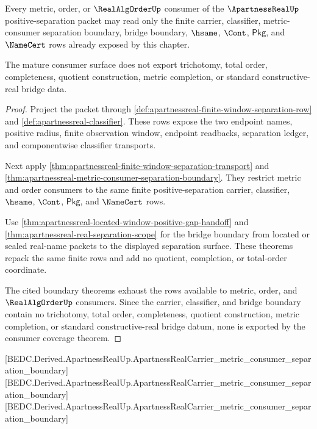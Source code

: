 \begin{theorem}
\label{thm:apartnessreal-mature-consumer-coverage}
Every metric, order, or $\RealAlgOrderUp$ consumer of the
$\ApartnessRealUp$ positive-separation packet may read only the finite carrier,
classifier, metric-consumer separation boundary, bridge boundary, $\hsame$,
$\Cont$, $\mathsf{Pkg}$, and $\NameCert$ rows already exposed by this chapter.

The mature consumer surface does not export trichotomy, total order,
completeness, quotient construction, metric completion, or standard
constructive-real bridge data.
\end{theorem}
\begin{proof}
Project the packet through
\autoref{def:apartnessreal-finite-window-separation-row} and
\autoref{def:apartnessreal-classifier}. These rows expose the two endpoint
names, positive radius, finite observation window, endpoint readbacks,
separation ledger, and componentwise classifier transports.

Next apply \autoref{thm:apartnessreal-finite-window-separation-transport} and
\autoref{thm:apartnessreal-metric-consumer-separation-boundary}. They restrict
metric and order consumers to the same finite positive-separation carrier,
classifier, $\hsame$, $\Cont$, $\mathsf{Pkg}$, and $\NameCert$ rows.

Use \autoref{thm:apartnessreal-located-window-positive-gap-handoff} and
\autoref{thm:apartnessreal-real-separation-scope} for the bridge boundary from
located or sealed real-name packets to the displayed separation surface. These
theorems repack the same finite rows and add no quotient, completion, or
total-order coordinate.

The cited boundary theorems exhaust the rows available to metric, order, and
$\RealAlgOrderUp$ consumers. Since the carrier, classifier, and bridge boundary
contain no trichotomy, total order, completeness, quotient construction, metric
completion, or standard constructive-real bridge datum, none is exported by the
consumer coverage theorem.
\end{proof}

[BEDC.Derived.ApartnessRealUp.ApartnessRealCarrier\_metric\_consumer\_separation\_boundary]
[BEDC.Derived.ApartnessRealUp.ApartnessRealCarrier\_metric\_consumer\_separation\_boundary]
[BEDC.Derived.ApartnessRealUp.ApartnessRealCarrier\_metric\_consumer\_separation\_boundary]

